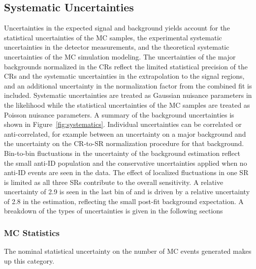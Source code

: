\subsection{Systematic Uncertainties}
\label{sec:stats:systs}
Uncertainties in the expected signal and background yields account for the statistical uncertainties of the MC samples,
the experimental systematic uncertainties in the detector measurements, and the theoretical systematic uncertainties of the MC simulation modeling.
The uncertainties of the major backgrounds normalized in the CRs reflect the limited statistical precision of the CRs and the systematic uncertainties in the extrapolation to the signal regions, and an additional uncertainty in the normalization factor from the combined fit is included.
Systematic uncertainties are treated as Gaussian nuisance parameters in the likelihood while the statistical uncertainties of the MC samples are treated as Poisson nuisance parameters.
A summary of the background uncertainties is shown in Figure~\ref{fig:systematics}.
Individual uncertainties can be correlated or anti-correlated, for example between an uncertainty on a major background and the uncertainty on the CR-to-SR normalization procedure for that background. 
Bin-to-bin fluctuations in the uncertainty of the \fake background estimation reflect the small anti-ID population and the conservative uncertainties applied when no anti-ID events are seen in the data.
The effect of localized fluctuations in one SR is limited as all three SRs contribute to the overall sensitivity.
A relative uncertainty of 2.9 is seen in the last \mZl bin of \SRTL and is driven by a relative uncertainty of 2.8 in the \fake estimation, reflecting the small post-fit background expectation.
A breakdown of the types of uncertainties is given in the following sections

\subsubsection{MC Statistics}
\label{sec:stats:systs:MCstats}
The nominal statistical uncertainty on the number of MC events generated makes up this category.

